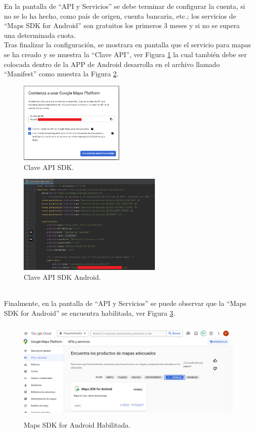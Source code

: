 \documentclass[a4paper,10pt, oneside, titlepage]{article}
\begin{document}
	\indent En la pantalla de ``API y Servicios'' se debe terminar de configurar la cuenta, si no se lo ha hecho, como país de origen, cuenta bancaria, etc.; los servicios de ``Maps SDK for Android'' son gratuitos los primeros 3 meses y si no se supera una determinada cuota. \\\newline
	\indent Tras finalizar la configuración, se mostrara en pantalla que el servicio para mapas se ha creado y se muestra la ``Clave API'', ver Figura \ref{Clave_API_SDK} la cual también debe ser colocada dentro de la APP de Android desarrolla en el archivo llamado ``Manifest'' como muestra la Figura \ref{Clave_API_SDK_Android}.
	\begin{figure}[!h]
		\centering
		\includegraphics[width = 1\linewidth, height = 4cm]{Clave_API_SDK.png}
		\caption{Clave API SDK.}
		\label{Clave_API_SDK}
	\end{figure}
	\begin{figure}[!h]
		\centering
		\includegraphics[width = 1\linewidth, height = 4.9cm]{Clave_API_SDK_Android.png}
		\caption{Clave API SDK Android.}
		\label{Clave_API_SDK_Android}
	\end{figure} \\
	\indent Finalmente, en la pantalla de ``API y Servicios'' se puede observar que la ``Maps SDK for Android'' se encuentra habilitada, ver Figura \ref{Maps_SDK_Android_Habilitada}.
	\begin{figure}[!h]
		\centering
		\includegraphics[width = 1\linewidth, height = 5cm]{Maps_SDK_Android_Habilitada.png}
		\caption{Maps SDK for Android Habilitada.}
		\label{Maps_SDK_Android_Habilitada}
	\end{figure} \\
\end{document}
